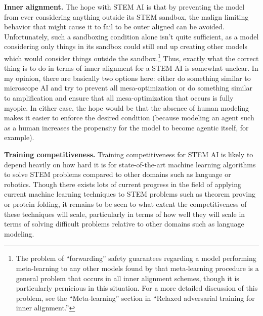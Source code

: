 \documentclass[
  onecolumn,
  natbib,
]{miri-tech-article}
\begin{document}
\textbf{Inner alignment.} The hope with STEM AI is that by preventing the model from ever considering anything outside its STEM sandbox, the malign limiting behavior that might cause it to fail to be outer aligned can be avoided. Unfortunately, such a sandboxing condition alone isn't quite sufficient, as a model considering only things in its sandbox could still end up creating other models which would consider things outside the sandbox.\footnote{The problem of ``forwarding'' safety guarantees regarding a model performing meta-learning to any other models found by that meta-learning procedure is a general problem that occurs in all inner alignment schemes, though it is particularly pernicious in this situation. For a more detailed discussion of this problem, see the ``Meta-learning'' section in ``Relaxed adversarial training for inner alignment\cite{TODO: cite https://www.alignmentforum.org/posts/9Dy5YRaoCxH9zuJqa/relaxed-adversarial-training-for-inner-alignment}.''} Thus, exactly what the correct thing is to do in terms of inner alignment for a STEM AI is somewhat unclear. In my opinion, there are basically two options here: either do something similar to microscope AI and try to prevent all mesa-optimization or do something similar to amplification and ensure that all mesa-optimization that occurs is fully myopic\cite{TODO: cite https://www.alignmentforum.org/posts/BKM8uQS6QdJPZLqCr/towards-a-mechanistic-understanding-of-corrigibility}. In either case, the hope would be that the absence of human modeling makes it easier to enforce the desired condition (because modeling an agent such as a human increases the propensity for the model to become agentic itself, for example).

\textbf{Training competitiveness.} Training competitiveness for STEM AI is likely to depend heavily on how hard it is for state-of-the-art machine learning algorithms to solve STEM problems compared to other domains such as language or robotics. Though there exists lots of current progress in the field of applying current machine learning techniques to STEM problems such as theorem\cite{TODO: cite https://arxiv.org/abs/1811.00796} proving\cite{TODO: cite https://arxiv.org/abs/1904.03241} or protein folding\cite{TODO: cite https://deepmind.com/blog/article/AlphaFold-Using-AI-for-scientific-discovery}, it remains to be seen to what extent the competitiveness of these techniques will scale, particularly in terms of how well they will scale in terms of solving difficult problems relative to other domains such as language modeling.
\end{document}
